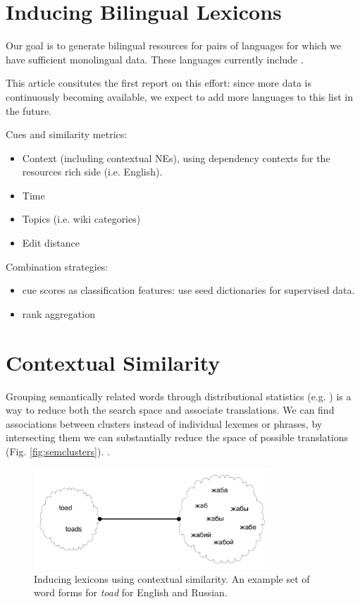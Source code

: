 \documentclass[11pt]{article}
\newcommand{\mnote}[1]{\marginpar{%
  \vskip-\baselineskip
  \raggedright\footnotesize
  \itshape\hrule\smallskip\tiny{#1}\par\smallskip\hrule}}
\newcommand{\mtodo}[1]{\mnote{\textcolor{red}{#1}}}
\begin{document}
\section{Inducing Bilingual Lexicons} \label{sect:lexinduct}

Our goal is to generate bilingual resources for pairs of languages for which we
have sufficient monolingual data. These languages currently include \mtodo{List
  languages}.

This article consitutes the first report on this effort: since more data is
continuously becoming available, we expect to add more languages to this list in
the future. 

Cues and similarity metrics:
\begin{itemize}
\setlength{\parskip}{0pt}
  \item Context (including contextual NEs), using dependency contexts for the resources rich side (i.e. English).
  \item Time
  \item Topics (i.e. wiki categories)
  \item Edit distance
\end{itemize}

\noindent Combination strategies:
\begin{itemize}
\setlength{\parskip}{0pt}
  \item cue scores as classification features: use seed dictionaries for supervised data.
  \item rank aggregation
\end{itemize}


\section{Contextual Similarity}

Grouping semantically related words through distributional statistics (e.g.
\cite{Pereira:1993}) is a way to reduce both the search space and associate
translations. We can find associations between clusters instead of individual
lexemes or phrases, by intersecting them we can substantially reduce the space
of possible translations (Fig. \ref{fig:semclusters}). \mtodo{Verbiage is very
  close to CCB's proposal}.

\begin{figure}
\centerline{\mbox{\includegraphics[width=3.5in]{figures/morphology}}}
\caption{Inducing lexicons using contextual similarity.  An example set of word forms for \emph{toad} for English and Russian.}
\label{fig:cycle} \label{fig:morphology}
\end{figure}
\end{document}
